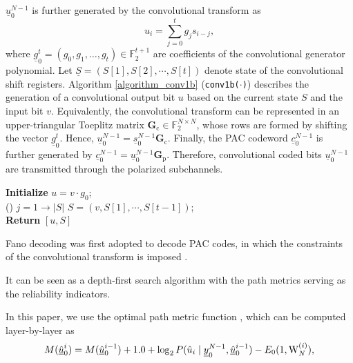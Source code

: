\documentclass[12pt, draftclsnofoot, peerreview, onecolumn]{IEEEtran}
\theoremstyle{noparent}
\begin{document}
$\underline{u}_{0}^{N-1}$ is further generated 
by the convolutional transform as 
\begin{equation}
    u_i=\sum_{j=0}^{t} g_j s_{i-j},
    \label{1_bit_convolutional}
\end{equation}
where $\underline{g}_{0}^{t}=\left(g_{0}, g_{1}, \ldots, g_{t}\right)\in \mathbb{F}_{2}^{t+1}$ 
are coefficients of the convolutional generator polynomial.
Let $\underline{S}=(S[1], S[2], \cdots, S[t])$ denote state of the convolutional shift registers.
Algorithm \ref{algorithm_conv1b} (\texttt{conv1b($\cdot$)}) describes the generation of 
a convolutional output bit $u$ based on the current state $S$ and the input bit $v$.
Equivalently, the convolutional transform can be represented in 
an upper-triangular Toeplitz matrix $\mathbf{G}_{\mathrm{c}}\in \mathbb{F}_{2}^{N \times N}$,
whose rows are formed by shifting the vector $\underline{g}_{0}^{t}$.
Hence, $\underline{u}_{0}^{N-1}=\underline{s}_{0}^{N-1} \mathbf{G}_{\mathrm{c}}$.
Finally, the PAC codeword $\underline{c}_{0}^{N-1}$ is further generated by
$\underline{c}_{0}^{N-1}=\underline{u}_{0}^{N-1} \mathbf{G}_{\mathrm{p}}$.
Therefore, convolutional coded bits $\underline{u}_{0}^{N-1}$ are transmitted
through the polarized subchannels.


\begin{algorithm}[t]
    \label{algorithm_conv1b}
    \caption{Generation of a single convolutional output bit, \texttt{conv1b($\cdot$)}}
    {\bf Initialize} $u=v\cdot g_0$;\\
    \For(){ $j=1\to |S|$}{
    }
    $S=(v,S[1], \cdots, S[t-1])$;\\
    {\bf Return} $[u, S]$\;
\end{algorithm}

Fano decoding was first adopted to decode PAC codes, in which 
the constraints of the convolutional transform is imposed \cite{Arikan2019sequentialdecodingchannel}.



It can be seen as a depth-first search algorithm with the path metrics serving as the reliability indicators.








In this paper, we use the optimal path metric function \cite{Moradi2021SequentialDecodingMetric}, 
which can be computed layer-by-layer as
\begin{equation}
    M(\underline{\hat{u}}_{0}^{i})=M(\underline{\hat{u}}_{0}^{i-1}) + 1.0 + \log _{2} P(\hat{u}_{i} \mid \underline{y}_{0}^{N-1}, \underline{\hat{u}}_{0}^{i-1})\\
    -E_{0}(1, \mathrm{W}_{N}^{(i)}),
    \label{Fano_metric}
\end{equation}
\end{document}
